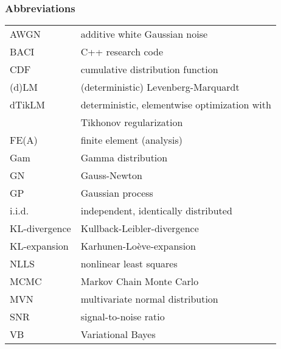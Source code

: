 \subsubsection*{Abbreviations}
\begin{tabular}{p{3cm} l}
  AWGN & additive white Gaussian noise \\
  BACI & C++ research code \\
  CDF & cumulative distribution function \\
  (d)LM & (deterministic) Levenberg-Marquardt \\
  dTikLM & deterministic, elementwise optimization with \\
         & Tikhonov regularization \\
  FE(A) & finite element (analysis) \\
  Gam & Gamma distribution \\
  GN & Gauss-Newton \\
  GP & Gaussian process \\
  i.i.d. & independent, identically distributed \\
  KL-divergence & Kullback-Leibler-divergence \\
  KL-expansion & Karhunen-Lo\`{e}ve-expansion \\
  NLLS & nonlinear least squares \\
  MCMC & Markov Chain Monte Carlo \\
  MVN & multivariate normal distribution \\
  SNR & signal-to-noise ratio \\
  VB & Variational Bayes \\
\end{tabular}
